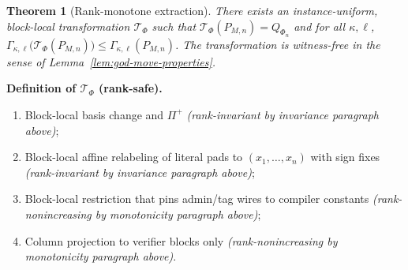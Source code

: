 \documentclass[12pt]{article}
\newtheorem{theorem}{Theorem}
\newtheorem{lemma}[theorem]{Lemma}
\theoremstyle{definition}
\theoremstyle{definition}
\theoremstyle{remark}
\theoremstyle{remark}
\begin{document}

\begin{theorem}[Rank-monotone extraction]\label{thm:tphi-appg}
There exists an instance-uniform, block-local transformation $\mathcal T_\Phi$ such that $\mathcal T_\Phi(P_{M,n})=Q_{\Phi_n}$ and for all $\kappa,\ell$,
$\Gamma_{\kappa,\ell}\!\big(\mathcal T_\Phi(P_{M,n})\big)\le \Gamma_{\kappa,\ell}(P_{M,n})$.
The transformation is witness-free in the sense of Lemma~\ref{lem:god-move-properties}.
\end{theorem}

\noindent\textbf{Definition of $\mathcal{T}_\Phi$ (rank-safe).}
\begin{enumerate}
\item Block-local basis change and $\Pi^+$ \emph{(rank-invariant by invariance paragraph above)};
\item Block-local affine relabeling of literal pads to $(x_1,\dots,x_n)$ with sign fixes \emph{(rank-invariant by invariance paragraph above)};
\item Block-local restriction that pins admin/tag wires to compiler constants \emph{(rank-nonincreasing by monotonicity paragraph above)};
\item Column projection to verifier blocks only \emph{(rank-nonincreasing by monotonicity paragraph above)}.
\end{enumerate}
\end{document}
